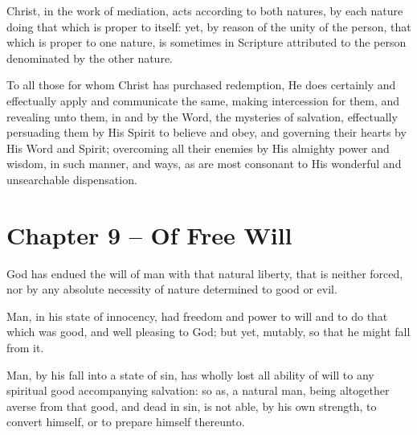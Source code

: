 \begin{outerlst}[left=0pt,labelsep=0pt]
\begin{innerlst}[resume*]
\item Christ, in the work of mediation, acts according to both natures, by each nature doing that which is proper to itself: yet, by reason of the unity of the person, that which is proper to one nature, is sometimes in Scripture attributed to the person denominated by the other nature.   



\item To all those for whom Christ has purchased redemption, He does certainly and effectually apply and communicate the same, making intercession for them, and revealing unto them, in and by the Word, the mysteries of salvation, effectually persuading them by His Spirit to believe and obey, and governing their hearts by His Word and Spirit; overcoming all their enemies by His almighty power and wisdom, in such manner, and ways, as are most consonant to His wonderful and unsearchable dispensation.  
\end{innerlst}

\item
{}
\section{Chapter 9 -- Of Free Will}
\begin{innerlst}[resume*]

\item God has endued the will of man with that natural liberty, that is neither forced, nor by any absolute necessity of nature determined to good or evil.   

\item Man, in his state of innocency, had freedom and power to will and to do that which was good, and well pleasing to God; but yet, mutably, so that he might fall from it.   

\item Man, by his fall into a state of sin, has wholly lost all ability of will to any spiritual good accompanying salvation: so as, a natural man, being altogether averse from that good, and dead in sin, is not able, by his own strength, to convert himself, or to prepare himself thereunto.    


\end{innerlst}
\end{outerlst}
